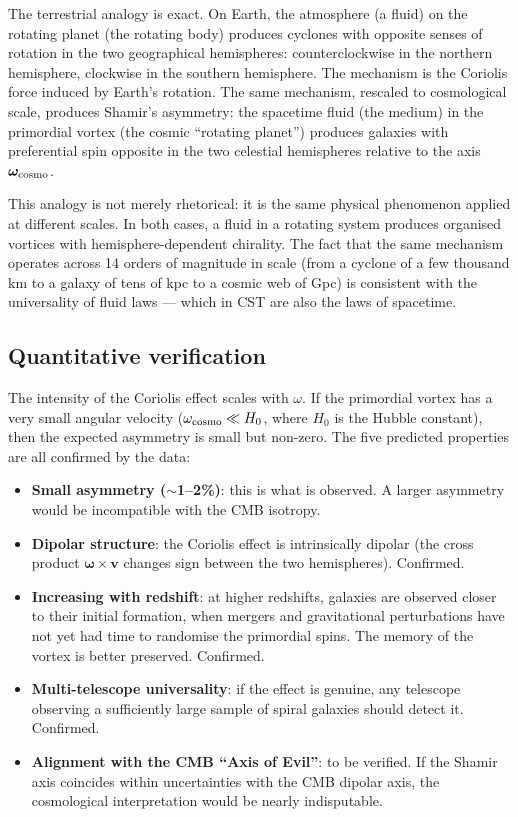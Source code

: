 \documentclass[10pt,a4paper]{article}
\begin{document}
The terrestrial analogy is exact. On Earth, the atmosphere (a fluid) on the rotating planet (the rotating body) produces cyclones with opposite senses of rotation in the two geographical hemispheres: counterclockwise in the northern hemisphere, clockwise in the southern hemisphere. The mechanism is the Coriolis force induced by Earth's rotation. The same mechanism, rescaled to cosmological scale, produces Shamir's asymmetry: the spacetime fluid (the medium) in the primordial vortex (the cosmic ``rotating planet'') produces galaxies with preferential spin opposite in the two celestial hemispheres relative to the axis $\boldsymbol{\omega}_{\rm cosmo}$.

This analogy is not merely rhetorical: it is the same physical phenomenon applied at different scales. In both cases, a fluid in a rotating system produces organised vortices with hemisphere-dependent chirality. The fact that the same mechanism operates across 14 orders of magnitude in scale (from a cyclone of a few thousand km to a galaxy of tens of kpc to a cosmic web of Gpc) is consistent with the universality of fluid laws --- which in CST are also the laws of spacetime.

\subsection{Quantitative verification}

The intensity of the Coriolis effect scales with $\omega$. If the primordial vortex has a very small angular velocity ($\omega_{\rm cosmo} \ll H_0$, where $H_0$ is the Hubble constant), then the expected asymmetry is small but non-zero. The five predicted properties are all confirmed by the data:

\begin{itemize}
\item \textbf{Small asymmetry ($\sim$1--2\%)}: this is what is observed. A larger asymmetry would be incompatible with the CMB isotropy.

\item \textbf{Dipolar structure}: the Coriolis effect is intrinsically dipolar (the cross product $\boldsymbol{\omega} \times \mathbf{v}$ changes sign between the two hemispheres). Confirmed.

\item \textbf{Increasing with redshift}: at higher redshifts, galaxies are observed closer to their initial formation, when mergers and gravitational perturbations have not yet had time to randomise the primordial spins. The memory of the vortex is better preserved. Confirmed.

\item \textbf{Multi-telescope universality}: if the effect is genuine, any telescope observing a sufficiently large sample of spiral galaxies should detect it. Confirmed.

\item \textbf{Alignment with the CMB ``Axis of Evil''}: to be verified. If the Shamir axis coincides within uncertainties with the CMB dipolar axis, the cosmological interpretation would be nearly indisputable.
\end{itemize}
\end{document}
